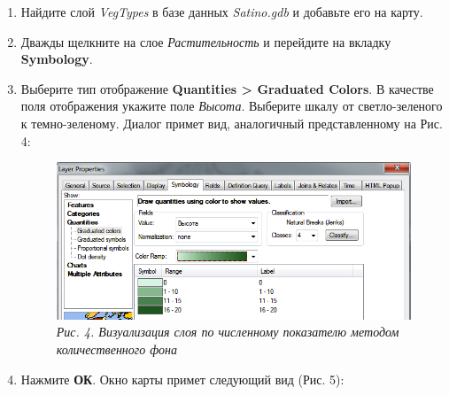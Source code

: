 \documentclass[12pt,]{book}
\begin{document}
\begin{enumerate}
\def\labelenumi{\arabic{enumi}.}
\item
  Найдите слой \emph{VegTypes} в базе данных \emph{Satino.gdb} и добавьте его на карту.
\item
  Дважды щелкните на слое \emph{Растительность} и перейдите на вкладку \textbf{Symbology}.
\item
  Выберите тип отображение \textbf{Quantities \textgreater{} Graduated Colors}. В качестве поля отображения укажите поле \emph{Высота}. Выберите шкалу от светло-зеленого к темно-зеленому. Диалог примет вид, аналогичный представленному на Рис. 4:

  \begin{figure}
  \centering
  \includegraphics{images/Ex18/image5.png}
  \caption{\emph{Рис. 4. Визуализация слоя по численному показателю методом количественного фона}}
  \end{figure}
\item
  Нажмите \textbf{ОК}. Окно карты примет следующий вид (Рис. 5):


\end{enumerate}
\end{document}
